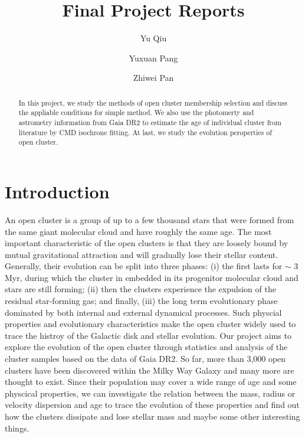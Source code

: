 \documentclass[modern]{aastex63}
\begin{document}
\title{Final Project Reports}
\author{Yu Qiu}
\author{Yuxuan Pang}
\author{Zhiwei Pan}

\begin{abstract}
In this project, we study the methods of open cluster membership selection and discuss the appliable conditions for simple method. We also use the photomerty and astrometry information from Gaia DR2 to estimate the age of individual cluster from literature by CMD isochrone fitting. At last, we study the evolution peroperties of open cluster.


\end{abstract}



\section{Introduction}\label{sec:intro}
An open cluster is a group of up to a few thousand stars that were formed from the same giant molecular cloud and have roughly the same age. The most important characteristic of the open clusters is that they are loosely bound by mutual gravitational attraction and will gradually lose their stellar content. Generally, their evolution can be split into three phases: (i) the first lasts for $\sim$ 3 Myr, during which the cluster in embedded in its progenitor molecular cloud and stars are still forming; (ii) then the clusters experience the expulsion of the residual star-forming gas; and finally, (iii) the long term evolutionary phase dominated by both internal and external dynamical processes. Such physcial properties and evolutionary characteristics make the open cluster widely used to trace the histroy of the Galactic disk and stellar evolution.
Our project aims to explore the evolution of the open cluster through statistics and analysis of the cluster samples based on the data of Gaia DR2. So far, more than 3,000 open clusters have been discovered within the Milky Way Galaxy and many more are thought to exist. Since their population may cover a wide range of age and some physcical properties, we can investigate the relation between the mass, radius or velocity dispersion and age to trace the evolution of these properties and find out how the clusters dissipate and lose stellar mass and maybe some other interesting things.
\end{document}
